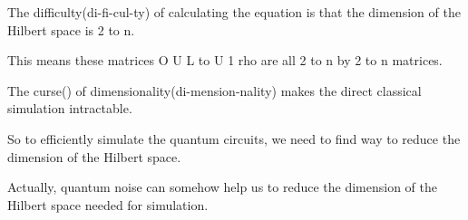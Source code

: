 \documentclass[10pt]{beamer}
\begin{document}
\begin{CJK}{UTF8}{gbsn}
{ %

 The difficulty(di-fi-cul-ty) of calculating the equation is that the dimension of the Hilbert space is 2 to n. 

 This means these matrices O U L to U 1 rho are all 2 to n by 2 to n matrices.

 The curse() of dimensionality(di-mension-nality) makes the direct classical simulation intractable.

 So to efficiently simulate the quantum circuits, we need to find way to reduce the dimension of the Hilbert space.

 Actually, quantum noise can somehow help us to reduce the dimension of the Hilbert space needed for simulation.
}




\end{CJK}
\end{document}
